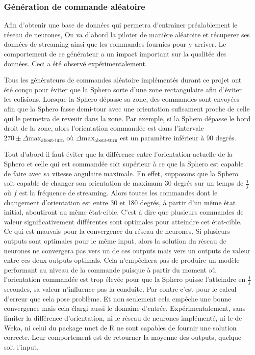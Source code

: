 \subsubsection{Génération de commande aléatoire}
Afin d'obtenir une base de données qui permetra d'entrainer préalablement le réseau de neurones,
On va d'abord la piloter de manière aléatoire et récuperer ses données de streaming ainsi que les commandes fournies pour y arriver.
Le comportement de ce générateur a un impact important sur la qualitée des données.
Ceci a été observé expérimentalement.

Tous les générateurs de commandes aléatoire implémentés durant ce projet ont été conçu pour éviter que la Sphero sorte d'une zone rectangulaire afin d'éviter les colisions.
Lorsque la Sphero dépasse sa zone, des commandes sont envoyées afin que la Sphero fasse demi-tour avec une orientation sufisament proche de celle qui le permetra de revenir dans la zone.
Par exemple, si la Sphero dépasse le bord droit de la zone,
alors l'orientation commandée est dans l'intervale $270 \pm \Delta\text{max}_{\text{about-turn}}$ où $\Delta\text{max}_{\text{about-turn}}$ est un paramètre inférieur à 90 degrés.

Tout d'abord il faut éviter que la différence entre l'orientation actuelle de la Sphero et celle qui est commandée soit supérieur à ce que la Sphero est capable de faire avec sa vitesse angulaire maximale.
En effet, supposons que la Sphero soit capable de changer son orientation de maximum 30 degrés sur un temps de $\frac{1}{f}$ où $f$ est la fréquence de streaming.
Alors toutes les commandes dont le changement d'orientation est entre 30 et 180 degrés, à partir d'un même état initial, aboutiront au même état-cible.
C'est à dire que plusieurs commandes de valeur significativement différentes sont optimales pour atteindre cet état-cible.
Ce qui est mauvais pour la convergence du réseau de neurones.
Si plusieurs outputs sont optimales pour le même input, alors la solution du réseau de neurones ne convergera pas vers un de ces outputs mais vers un outputs de valeur entre ces deux outputs optimals.
Cela n'empêchera pas de produire un modèle performant au niveau de la commande puisque à partir du moment où l'orientation commandée est trop élevée pour que la Sphero puisse l'atteindre en $\frac{1}{f}$ secondes, sa valeur n'influence pas la conduite.
Par contre c'est pour le calcul d'erreur que cela pose problème.
Et non seulement cela empêche une bonne convergence mais cela élargi aussi le domaine d'entrée.
Expérimentalement, sans limiter la différence d'orientation, ni le réseau de neurones implémenté, ni le \mlp de Weka, ni celui du package nnet de R ne sont capables de fournir une solution correcte.
Leur comportement est de retourner la moyenne des outputs, quelque soit l'input.\\


